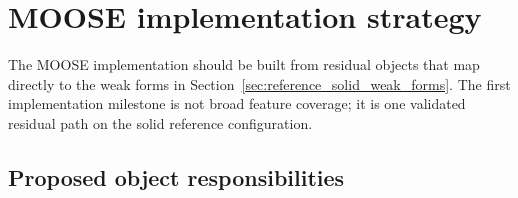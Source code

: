 \section{MOOSE implementation strategy}
\label{sec:moose_implementation_strategy}

The MOOSE implementation should be built from residual objects that map
directly to the weak forms in Section~\ref{sec:reference_solid_weak_forms}.  The
first implementation milestone is not broad feature coverage; it is one
validated residual path on the solid reference configuration.

\subsection{Proposed object responsibilities}
\label{sec:object_responsibilities}

